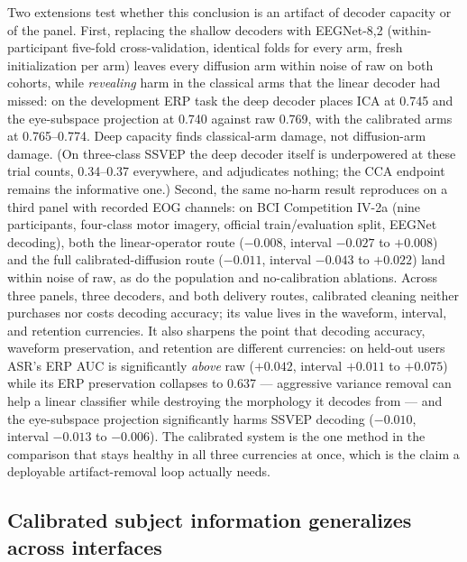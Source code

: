 Two extensions test whether this conclusion is an artifact of decoder capacity or of the panel. First, replacing the shallow decoders with EEGNet-8,2 (within-participant five-fold cross-validation, identical folds for every arm, fresh initialization per arm) leaves every diffusion arm within noise of raw on both cohorts, while \emph{revealing} harm in the classical arms that the linear decoder had missed: on the development ERP task the deep decoder places ICA at 0.745 and the eye-subspace projection at 0.740 against raw 0.769, with the calibrated arms at 0.765--0.774. Deep capacity finds classical-arm damage, not diffusion-arm damage. (On three-class SSVEP the deep decoder itself is underpowered at these trial counts, 0.34--0.37 everywhere, and adjudicates nothing; the CCA endpoint remains the informative one.) Second, the same no-harm result reproduces on a third panel with recorded EOG channels: on BCI Competition IV-2a (nine participants, four-class motor imagery, official train/evaluation split, EEGNet decoding), both the linear-operator route ($-0.008$, interval $-0.027$ to $+0.008$) and the full calibrated-diffusion route ($-0.011$, interval $-0.043$ to $+0.022$) land within noise of raw, as do the population and no-calibration ablations. Across three panels, three decoders, and both delivery routes, calibrated cleaning neither purchases nor costs decoding accuracy; its value lives in the waveform, interval, and retention currencies. It also sharpens the point that decoding accuracy, waveform preservation, and retention are different currencies: on held-out users ASR's ERP AUC is significantly \emph{above} raw ($+0.042$, interval $+0.011$ to $+0.075$) while its ERP preservation collapses to 0.637 --- aggressive variance removal can help a linear classifier while destroying the morphology it decodes from --- and the eye-subspace projection significantly harms SSVEP decoding ($-0.010$, interval $-0.013$ to $-0.006$). The calibrated system is the one method in the comparison that stays healthy in all three currencies at once, which is the claim a deployable artifact-removal loop actually needs.

\subsection{Calibrated subject information generalizes across interfaces}
\label{sec:res-representation}

